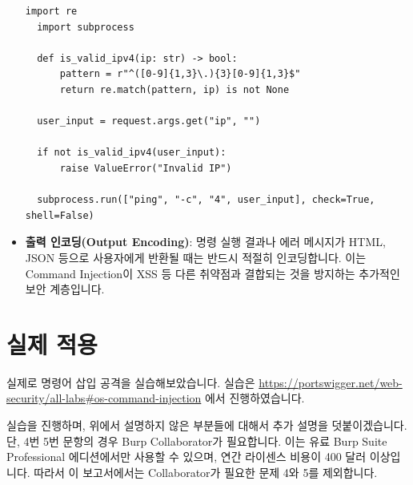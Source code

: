 \documentclass{article}
\begin{document}
\begin{itemize}
  \begin{lstlisting}[caption={Python: subprocess.run 사용 (shell=False). 입력 검증 포함}]
  import re
  import subprocess

  def is_valid_ipv4(ip: str) -> bool:
      pattern = r"^([0-9]{1,3}\.){3}[0-9]{1,3}$"
      return re.match(pattern, ip) is not None

  user_input = request.args.get("ip", "")

  if not is_valid_ipv4(user_input):
      raise ValueError("Invalid IP")

  subprocess.run(["ping", "-c", "4", user_input], check=True, shell=False)
  \end{lstlisting}

  \item \textbf{출력 인코딩(Output Encoding)}:  
  명령 실행 결과나 에러 메시지가 HTML, JSON 등으로 사용자에게 반환될 때는 반드시 적절히 인코딩합니다.  
  이는 Command Injection이 XSS 등 다른 취약점과 결합되는 것을 방지하는 추가적인 보안 계층입니다.
\end{itemize}

\newpage
\section*{실제 적용}
실제로 명령어 삽입 공격을 실습해보았습니다. 실습은 \url{https://portswigger.net/web-security/all-labs#os-command-injection} 에서 진행하였습니다.

실습을 진행하며, 위에서 설명하지 않은 부분들에 대해서 추가 설명을 덧붙이겠습니다.
단, 4번 5번 문항의 경우 Burp Collaborator가 필요합니다. 이는 유료 Burp Suite Professional 에디션에서만 사용할 수 있으며, 연간 라이센스 비용이 400 달러 이상입니다. 
따라서 이 보고서에서는 Collaborator가 필요한 문제 4와 5를 제외합니다.
\end{document}
